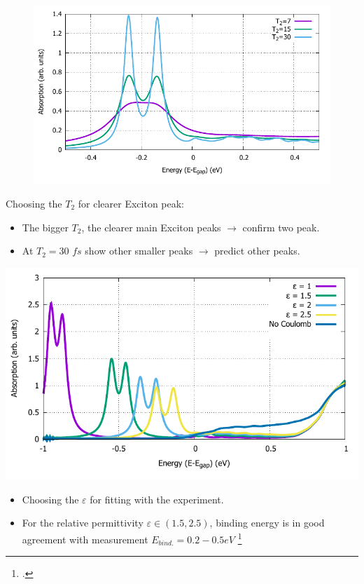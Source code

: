 \documentclass{beamer}
\begin{document}
\begin{frame}
	\begin{figure}
		\includegraphics[width=0.8\linewidth]{images/varyT2.pdf}
	\end{figure}
Choosing the $T_2$ for clearer Exciton peak:
	\begin{itemize}
		\item The bigger $T_2$, the clearer main Exciton peaks $\to $ confirm two peak.
		\item At $T_2 = 30$ \(fs\) show other smaller peaks $\to $ predict other peaks.
	\end{itemize}
\end{frame}
\begin{frame}
	\begin{center}		
		\includegraphics[width=0.8\linewidth]{images/varyepsilon.pdf}
	\end{center}
	\begin{itemize}
		\item Choosing the $\varepsilon$ for fitting with the experiment.
		\item For the relative permittivity $\varepsilon \in (1.5,2.5)$, binding energy is in good agreement with measurement $E_{bind.}= 0.2-0.5 eV$ \footcite{zhang_absorption_2014}
	\end{itemize}
\end{frame}
\end{document}
